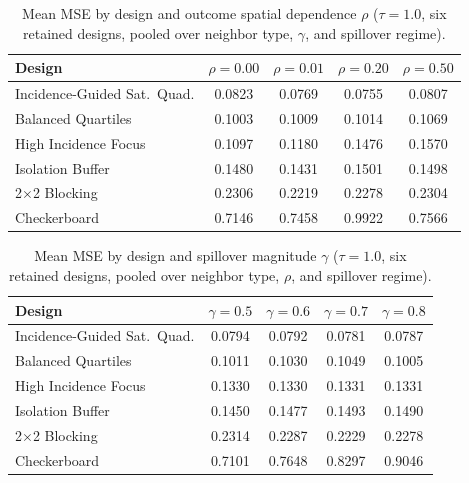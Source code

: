 \documentclass[11pt]{article}
\begin{document}
\begin{table}[h]
\centering
\caption{Mean MSE by design and outcome spatial dependence $\rho$ ($\tau=1.0$,
six retained designs, pooled over neighbor type, $\gamma$, and spillover
regime).}
\begin{tabular}{lcccc}
\toprule
Design & $\rho=0.00$ & $\rho=0.01$ & $\rho=0.20$ & $\rho=0.50$ \\
\midrule
Incidence-Guided Sat.\ Quad. & 0.0823 & 0.0769 & 0.0755 & 0.0807 \\
Balanced Quartiles           & 0.1003 & 0.1009 & 0.1014 & 0.1069 \\
High Incidence Focus         & 0.1097 & 0.1180 & 0.1476 & 0.1570 \\
Isolation Buffer             & 0.1480 & 0.1431 & 0.1501 & 0.1498 \\
2$\times$2 Blocking          & 0.2306 & 0.2219 & 0.2278 & 0.2304 \\
Checkerboard                 & 0.7146 & 0.7458 & 0.9922 & 0.7566 \\
\bottomrule
\end{tabular}
\end{table}

\begin{table}[h]
\centering
\caption{Mean MSE by design and spillover magnitude $\gamma$ ($\tau=1.0$, six
retained designs, pooled over neighbor type, $\rho$, and spillover regime).}
\begin{tabular}{lcccc}
\toprule
Design & $\gamma=0.5$ & $\gamma=0.6$ & $\gamma=0.7$ & $\gamma=0.8$ \\
\midrule
Incidence-Guided Sat.\ Quad. & 0.0794 & 0.0792 & 0.0781 & 0.0787 \\
Balanced Quartiles           & 0.1011 & 0.1030 & 0.1049 & 0.1005 \\
High Incidence Focus         & 0.1330 & 0.1330 & 0.1331 & 0.1331 \\
Isolation Buffer             & 0.1450 & 0.1477 & 0.1493 & 0.1490 \\
2$\times$2 Blocking          & 0.2314 & 0.2287 & 0.2229 & 0.2278 \\
Checkerboard                 & 0.7101 & 0.7648 & 0.8297 & 0.9046 \\
\bottomrule
\end{tabular}
\end{table}
\end{document}
